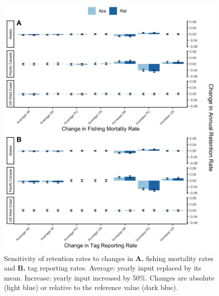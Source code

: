 \documentclass{article}
\begin{document}
\begin{figure}[htb]
    \centering
    \includegraphics[width = \textwidth]{figs/bar-sensitivity}
    \caption{Sensitivity of retention rates to changes in \textbf{A.} fishing mortality rates and \textbf{B.} tag reporting rates. Average: yearly input replaced by its mean. Increase: yearly input increased by 50\%. Changes are absolute (light blue) or relative to the reference value (dark blue).}
    \label{fig:bar-sensitivity}
\end{figure}
\end{document}
